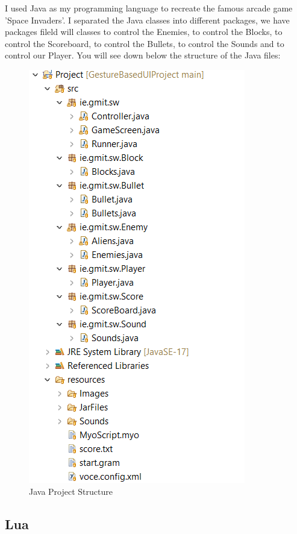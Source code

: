\documentclass{article}
\begin{document}
\hfill \break
I used Java as my programming language to recreate the famous arcade game 'Space Invaders'. I separated the Java classes into different packages, we have packages fileld will classes to control the Enemies, to control the Blocks, to control the Scoreboard, to control the Bullets, to control the Sounds and to control our Player. You will see down below the structure of the Java files:

\begin{figure}[h]
    \includegraphics[scale=0.6]{img/javastructure.png}
    \centering
    \caption{Java Project Structure}
    \label{fig: A Picture of the Java Project Structure}
\end{figure}

\subsection{Lua}
\end{document}
